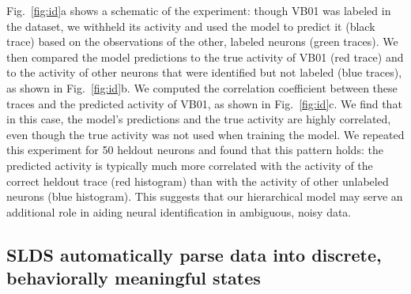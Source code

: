 \documentclass[11pt]{article}
\begin{document}
Fig.~\ref{fig:id}a shows a schematic of the experiment: though VB01
was labeled in the dataset, we withheld its activity and used the
model to predict it (black trace) based on the observations of the
other, labeled neurons (green traces).  We then compared the model
predictions to the true activity of VB01 (red trace) and to the
activity of other neurons that were identified but not labeled (blue
traces), as shown in Fig.~\ref{fig:id}b.  We computed the correlation
coefficient between these traces and the predicted activity of VB01,
as shown in Fig.~\ref{fig:id}c.
We find that in this case, the model's predictions and the true activity
are highly correlated, even though the true activity was not used
when training the model.  We repeated this experiment for 50 heldout
neurons and found that this pattern holds: the predicted activity is
typically much more correlated with the activity of the correct
heldout trace (red histogram) than with the activity of other unlabeled
neurons (blue histogram).  This suggests that our hierarchical model
may serve an additional role in aiding neural identification in
ambiguous, noisy data. 



\subsection*{SLDS automatically parse data into discrete, behaviorally meaningful states}
\end{document}
